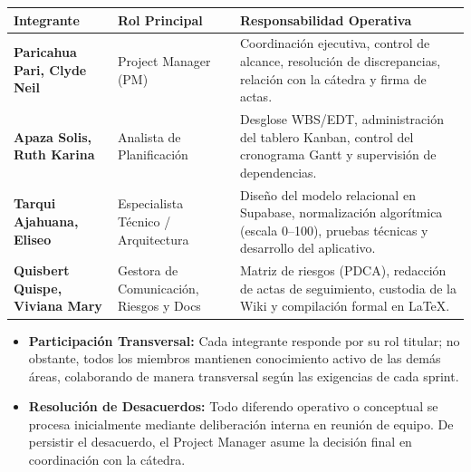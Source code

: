 \documentclass[11pt,a4paper]{article}
\begin{document}
\vspace{0.25cm}
\noindent\begin{tabularx}{\textwidth}{p{4.8cm} p{3.8cm} X}
\toprule
\textbf{Integrante} & \textbf{Rol Principal} & \textbf{Responsabilidad Operativa} \\
\midrule
\textbf{Paricahua Pari, Clyde Neil} & Project Manager (PM) & Coordinación ejecutiva, control de alcance, resolución de discrepancias, relación con la cátedra y firma de actas. \\
\addlinespace[4pt]
\textbf{Apaza Solis, Ruth Karina} & Analista de Planificación & Desglose WBS/EDT, administración del tablero Kanban, control del cronograma Gantt y supervisión de dependencias. \\
\addlinespace[4pt]
\textbf{Tarqui Ajahuana, Eliseo} & Especialista Técnico / Arquitectura & Diseño del modelo relacional en Supabase, normalización algorítmica (escala 0--100), pruebas técnicas y desarrollo del aplicativo. \\
\addlinespace[4pt]
\textbf{Quisbert Quispe, Viviana Mary} & Gestora de Comunicación, Riesgos y Docs & Matriz de riesgos (PDCA), redacción de actas de seguimiento, custodia de la Wiki y compilación formal en LaTeX. \\
\bottomrule
\end{tabularx}
\vspace{0.3cm}

\begin{itemize}[leftmargin=*]
    \item \textbf{Participación Transversal:} Cada integrante responde por su rol titular; no obstante, todos los miembros mantienen conocimiento activo de las demás áreas, colaborando de manera transversal según las exigencias de cada sprint.
    \item \textbf{Resolución de Desacuerdos:} Todo diferendo operativo o conceptual se procesa inicialmente mediante deliberación interna en reunión de equipo. De persistir el desacuerdo, el Project Manager asume la decisión final en coordinación con la cátedra.
\end{itemize}

\clearpage

\end{document}
